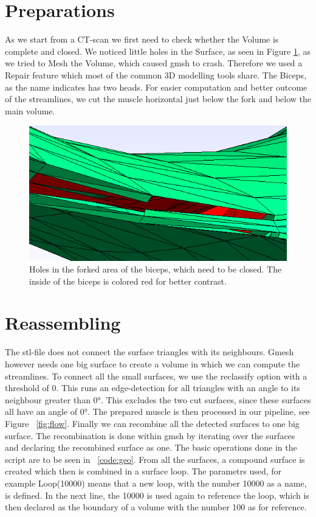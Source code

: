 \documentclass[preprint,journal]{vgtc}       %
\begin{document}
\section{Preparations}
As we start from a CT-scan we first need to check whether the Volume is complete and closed. 
We noticed little holes in the Surface, as seen  in Figure \ref{fig:holes}, as we tried to Mesh the Volume, which caused gmsh to crash. 
Therefore we used a Repair feature which most of the common 3D modelling tools share. 
The Biceps, as the name indicates has two heads. 
For easier computation and better outcome of the streamlines, we cut  the muscle horizontal just below the fork and below the main volume. 

\begin{figure}
	\begin{center}
		\includegraphics[width = .6\linewidth]{holes.png}
	\end{center}
	\caption{Holes in the forked area of the biceps, which need to be closed. The inside of the biceps is colored red for better contrast.}
	\label{fig:holes}
\end{figure}

\section{Reassembling}
The stl-file does not connect the surface triangles with its neighbours. 
Gmesh however needs one big surface to create a volume in which we can compute the streamlines. 
To connect all the small surfaces, we use the reclassify option with a threshold of 0.
This runs an edge-detection for all triangles with an angle to its neighbour greater than \ang{0}. 
This excludes the two cut surfaces, since these surfaces all have an angle of \ang{0}. 
The prepared muscle is then processed in our pipeline, see Figure ~\ref{fig:flow}. 
Finally we can recombine all the detected surfaces to one big surface. 
The recombination is done within gmsh by iterating over the surfaces and declaring the recombined surface as one. 
The basic operations done in the script are to be seen in ~\ref{code:geo}. 
From all the surfaces, a compound surface is created which then is combined in a surface loop. 
The parametrs used, for example Loop(10000) means that a new loop, with the number 10000 as a name, is defined. 
In the next line, the 10000 is used again to reference the loop, which is then declared as the boundary of a volume with the number 100 as for reference. 
\end{document}
